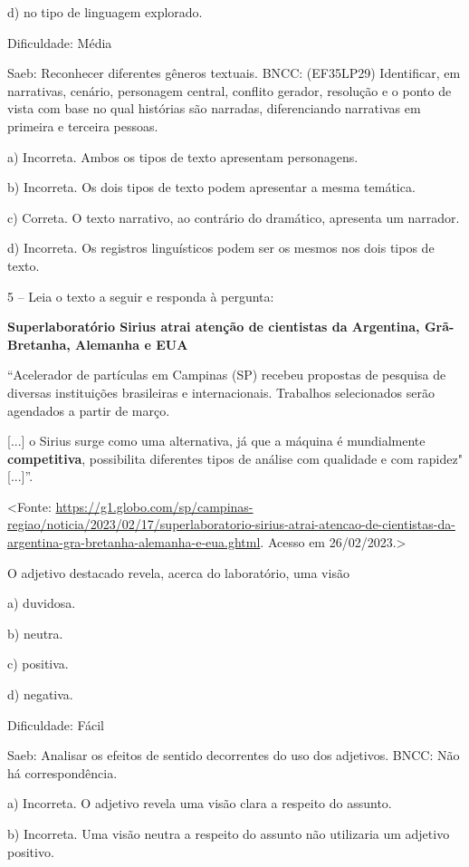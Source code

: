 d) no tipo de linguagem explorado.

Dificuldade: Média

Saeb: Reconhecer diferentes gêneros textuais. BNCC: (EF35LP29)
Identificar, em narrativas, cenário, personagem central, conflito
gerador, resolução e o ponto de vista com base no qual histórias são
narradas, diferenciando narrativas em primeira e terceira pessoas.

a) Incorreta. Ambos os tipos de texto apresentam personagens.

b) Incorreta. Os dois tipos de texto podem apresentar a mesma temática.

c) Correta. O texto narrativo, ao contrário do dramático, apresenta um
narrador.

d) Incorreta. Os registros linguísticos podem ser os mesmos nos dois
tipos de texto.

5 -- Leia o texto a seguir e responda à pergunta:

\textbf{Superlaboratório Sirius atrai atenção de cientistas da
Argentina, Grã-Bretanha, Alemanha e EUA}

``Acelerador de partículas em Campinas (SP) recebeu propostas de
pesquisa de diversas instituições brasileiras e internacionais.
Trabalhos selecionados serão agendados a partir de março.

{[}...{]} o Sirius surge como uma alternativa, já que a máquina é
mundialmente \textbf{competitiva}, possibilita diferentes tipos de
análise com qualidade e com rapidez" {[}...{]}''.

\textless{}Fonte:
\url{https://g1.globo.com/sp/campinas-regiao/noticia/2023/02/17/superlaboratorio-sirius-atrai-atencao-de-cientistas-da-argentina-gra-bretanha-alemanha-e-eua.ghtml}.
Acesso em 26/02/2023.\textgreater{}

O adjetivo destacado revela, acerca do laboratório, uma visão

a) duvidosa.

b) neutra.

c) positiva.

d) negativa.

Dificuldade: Fácil

Saeb: Analisar os efeitos de sentido decorrentes do uso dos adjetivos.
BNCC: Não há correspondência.

a) Incorreta. O adjetivo revela uma visão clara a respeito do assunto.

b) Incorreta. Uma visão neutra a respeito do assunto não utilizaria um
adjetivo positivo.

